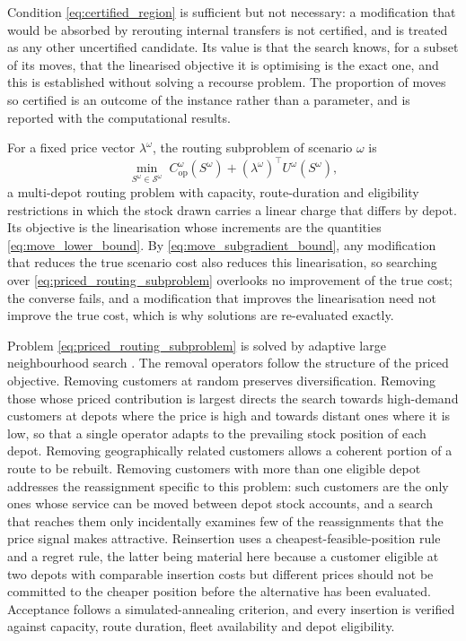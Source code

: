 \documentclass[authoryear,final,3p,times]{elsarticle}
\theoremstyle{definition}
\theoremstyle{plain}
\begin{document}
Condition \eqref{eq:certified_region} is sufficient but not necessary: a
modification that would be absorbed by rerouting internal transfers is not
certified, and is treated as any other uncertified candidate. Its value is
that the search knows, for a subset of its moves, that the linearised
objective it is optimising is the exact one, and this is established without
solving a recourse problem. The proportion of moves so certified is an
outcome of the instance rather than a parameter, and is reported with the
computational results.

For a fixed price vector $\lambda^\omega$, the routing subproblem of scenario
$\omega$ is
\begin{equation}
 \min_{S^\omega\in\mathcal S^\omega}\;
 C_{\mathrm{op}}^\omega(S^\omega)+(\lambda^\omega)^\top U^\omega(S^\omega),
 \label{eq:priced_routing_subproblem}
\end{equation}
a multi-depot routing problem with capacity, route-duration and eligibility
restrictions in which the stock drawn carries a linear charge that differs by depot.
Its objective is the linearisation whose increments are the quantities
\eqref{eq:move_lower_bound}. By \eqref{eq:move_subgradient_bound}, any
modification that reduces the true scenario cost also reduces this
linearisation, so searching over \eqref{eq:priced_routing_subproblem}
overlooks no improvement of the true cost; the converse fails, and a
modification that improves the linearisation need not improve the true
cost, which is why solutions are re-evaluated exactly.

Problem \eqref{eq:priced_routing_subproblem} is solved by adaptive large
neighbourhood search \citep{ropke2006adaptive,pisinger2007general}. The
removal operators follow the structure of the priced objective. Removing
customers at random preserves diversification. Removing those whose priced
contribution is largest directs the search towards high-demand customers at
depots where the price is high and towards distant ones where it is low, so
that a single operator adapts to the prevailing stock position of each
depot. Removing geographically related customers allows a coherent
portion of a route to be rebuilt. Removing customers with more than one
eligible depot addresses the reassignment specific to this problem: such
customers are the only ones whose service can be moved between depot stock
accounts, and a search that reaches them only incidentally examines few of
the reassignments that the price signal makes attractive. Reinsertion uses a
cheapest-feasible-position rule and a regret rule, the latter being material
here because a customer eligible at two depots with comparable insertion
costs but different prices should not be committed to the cheaper position
before the alternative has been evaluated. Acceptance follows a
simulated-annealing criterion, and every insertion is verified against
capacity, route duration, fleet availability and depot eligibility.
\end{document}
